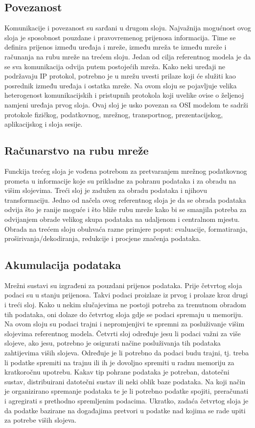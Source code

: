 \documentclass[times, utf8, diplomski]{fer}
\begin{document}
\subsection{Povezanost}
Komunikacije i povezanost su sarđani u drugom sloju. Najvažnija mogućnost ovog sloja je sposobnost pouzdane i pravovremenog prijenosa informacija. Time se definira prijenos između uređaja i mreže, između mreža te između mreže i računanja na rubu mreže na trećem sloju. Jedan od cilja referentnog modela je da se sva komunikacija odvija putem postojećih mreža. Kako neki uređaji ne podržavaju IP protokol, potrebno je u mrežu uvesti prilaze  koji će služiti kao posrednik između uređaja i ostatka mreže. Na ovom sloju se pojavljuje velika heterogenost komunikacijskih i pristupnih protokola koji uvelike ovise o željenoj namjeni uređaja prvog sloja. Ovaj sloj je usko povezan sa OSI modelom te sadrži protokole fizičkog, podatkovnog, mrežnog, transportnog, prezentacijskog, aplikacijskog i sloja sesije.

\subsection{Računarstvo na rubu mreže}
Funckija trećeg sloja je vođena potrebom za pretvaranjem mrežnog podatkovnog prometa u informacije koje su prikladne za pohranu podataka i za obradu na višim slojevima. Treći sloj je zadužen za obradu podataka i njihovu transformaciju. Jedno od načela ovog referentnog sloja je da se obrada podataka odvija što je ranije moguće i što bliže rubu mreže kako bi se smanjila potreba za odvijanjem obrade velikog skupa podataka na udaljenom i centralnom mjestu. Obrada na trećem sloju obuhvaća razne primjere poput: evaluacije, formatiranja, proširivanja/dekodiranja, redukcije i procjene značenja podataka.

\subsection{Akumulacija podataka}
Mrežni sustavi su izgrađeni za pouzdani prijenos podataka. Prije četvrtog sloja podaci su u stanju prijenosa. Takvi podaci proizlaze iz prvog i prolaze kroz drugi i treći sloj. Kako u nekim slučajevima ne postoji potreba za trenutnom obradom tih podataka, oni dolaze do četvrtog sloja gdje se podaci spremaju u memoriju. Na ovom sloju su podaci trajni i nepromjenjivi te spremni za posluživanje višim slojevima referentnog modela. Četvrti sloj određuje jesu li podaci važni za više slojeve, ako jesu, potrebno je osigurati načine posluživanja tih podataka zahtijevima viših slojeva. Određuje je li potrebno da podaci budu trajni, tj. treba li podatke spremiti na trajnu ili ih je dovoljno spremiti u radnu memoriju za kratkoročnu upotrebu. Kakav tip pohrane podataka je potreban, datotečni sustav, distribuirani datotečni sustav ili neki oblik baze podataka. Na koji način je organizirano spremanje podataka te je li potrebno podatke spojiti, preračunati i agregirati s prethodno spremljenim podacima. Ukratko, zadaća četvrtog sloja je da podatke bazirane na događajima pretvori u podatke nad kojima se rade upiti za potrebe viših slojeva.
\end{document}
